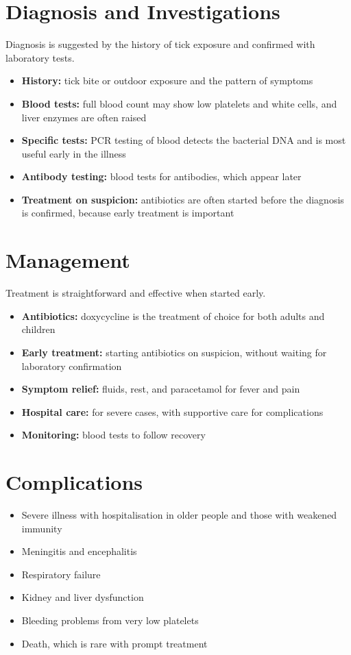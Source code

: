 \section*{Diagnosis and Investigations}
Diagnosis is suggested by the history of tick exposure and confirmed with laboratory tests.
\begin{itemize}
    \item \textbf{History:} tick bite or outdoor exposure and the pattern of symptoms
    \item \textbf{Blood tests:} full blood count may show low platelets and white cells, and liver enzymes are often raised
    \item \textbf{Specific tests:} PCR testing of blood detects the bacterial DNA and is most useful early in the illness
    \item \textbf{Antibody testing:} blood tests for antibodies, which appear later
    \item \textbf{Treatment on suspicion:} antibiotics are often started before the diagnosis is confirmed, because early treatment is important
\end{itemize}

\section*{Management}
Treatment is straightforward and effective when started early.
\begin{itemize}
    \item \textbf{Antibiotics:} doxycycline is the treatment of choice for both adults and children
    \item \textbf{Early treatment:} starting antibiotics on suspicion, without waiting for laboratory confirmation
    \item \textbf{Symptom relief:} fluids, rest, and paracetamol for fever and pain
    \item \textbf{Hospital care:} for severe cases, with supportive care for complications
    \item \textbf{Monitoring:} blood tests to follow recovery
\end{itemize}

\section*{Complications}
\begin{itemize}
    \item Severe illness with hospitalisation in older people and those with weakened immunity
    \item Meningitis and encephalitis
    \item Respiratory failure
    \item Kidney and liver dysfunction
    \item Bleeding problems from very low platelets
    \item Death, which is rare with prompt treatment
\end{itemize}

